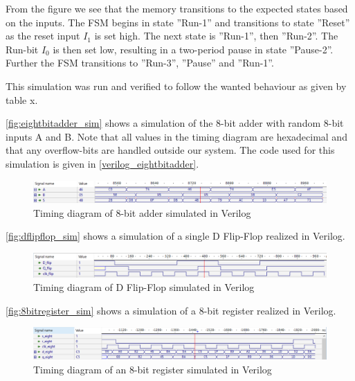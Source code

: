 From the figure we see that the memory transitions to the expected states based on the inputs. The FSM begins in state ''Run-1'' and transitions to state ''Reset'' as the reset input $I_1$ is set high. The next state is ''Run-1'', then ''Run-2''. The Run-bit $I_0$ is then set low, resulting in a two-period pause in state ''Pause-2''. Further the FSM transitions to ''Run-3'', ''Pause'' and ''Run-1''.

This simulation was run and verified to follow the wanted behaviour as given by table x.

\autoref{fig:eightbitadder_sim} shows a simulation of the 8-bit adder with random 8-bit inputs A and B. Note that all values in the timing diagram are hexadecimal and that any overflow-bits are handled outside our system. The code used for this simulation is given in \autoref{verilog_eightbitadder}.

\begin{figure}[H]
    \centering
    \includegraphics[width=\textwidth]{Figures/Test of eightbitadder.png}
    \caption{Timing diagram of 8-bit adder simulated in Verilog}
    \label{fig:eightbitadder_sim}
\end{figure}

\autoref{fig:dflipflop_sim} shows a simulation of a single D Flip-Flop realized in Verilog.

\begin{figure}[H]
    \centering
    \includegraphics[width=\textwidth]{Figures/Test of Dflipflop.png}
    \caption{Timing diagram of D Flip-Flop simulated in Verilog}
    \label{fig:dflipflop_sim}
\end{figure}

\autoref{fig:8bitregister_sim} shows a simulation of a 8-bit register realized in Verilog.

\begin{figure}[H]
    \centering
    \includegraphics[width=\textwidth]{Figures/VerilogPlot_8bitreg.png}
    \caption{Timing diagram of an 8-bit register simulated in Verilog}
    \label{fig:8bitregister_sim}
\end{figure}

